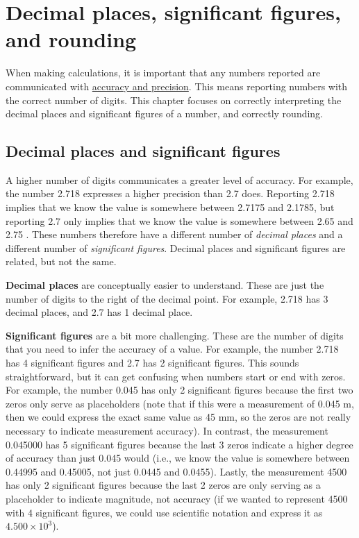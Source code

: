 \documentclass[
]{scrbook}
\begin{document}
\hypertarget{Chapter_9}{%
\chapter{Decimal places, significant figures, and rounding}\label{Chapter_9}}

When making calculations, it is important that any numbers reported are communicated with \protect\hyperlink{Chapter_6}{accuracy and precision}.
This means reporting numbers with the correct number of digits.
This chapter focuses on correctly interpreting the decimal places and significant figures of a number, and correctly rounding.

\hypertarget{decimal-places-and-significant-figures}{%
\section{Decimal places and significant figures}\label{decimal-places-and-significant-figures}}

A higher number of digits communicates a greater level of accuracy.
For example, the number 2.718 expresses a higher precision than 2.7 does.
Reporting 2.718 implies that we know the value is somewhere between 2.7175 and 2.1785, but reporting 2.7 only implies that we know the value is somewhere between 2.65 and 2.75 \citep{Sokal1995}.
These numbers therefore have a different number of \emph{decimal places} and a different number of \emph{significant figures}.
Decimal places and significant figures are related, but not the same.

\textbf{Decimal places} are conceptually easier to understand. These are just the number of digits to the right of the decimal point. For example, 2.718 has 3 decimal places, and 2.7 has 1 decimal place.

\textbf{Significant figures} are a bit more challenging.
These are the number of digits that you need to infer the accuracy of a value.
For example, the number 2.718 has 4 significant figures and 2.7 has 2 significant figures. This sounds straightforward, but it can get confusing when numbers start or end with zeros.
For example, the number 0.045 has only 2 significant figures because the first two zeros only serve as placeholders (note that if this were a measurement of 0.045 m, then we could express the exact same value as 45 mm, so the zeros are not really necessary to indicate measurement accuracy).
In contrast, the measurement 0.045000 has 5 significant figures because the last 3 zeros indicate a higher degree of accuracy than just 0.045 would (i.e., we know the value is somewhere between 0.44995 and 0.45005, not just 0.0445 and 0.0455).
Lastly, the measurement 4500 has only 2 significant figures because the last 2 zeros are only serving as a placeholder to indicate magnitude, not accuracy (if we wanted to represent 4500 with 4 significant figures, we could use scientific notation and express it as \(4.500 \times 10^3\)).
\end{document}
